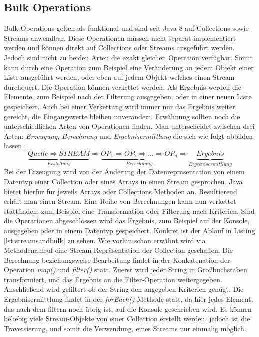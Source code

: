 \subsection{Bulk Operations}
Bulk Operations gelten als funktional und sind seit Java 8 auf Collections sowie Streams anwendbar. Diese Operationen müssen nicht separat implementiert werden und können direkt auf Collections oder Streams ausgeführt werden. Jedoch sind nicht zu beiden Arten die exakt gleichen Operation verfügbar. Somit kann durch eine Operation zum Beispiel eine Veränderung an jedem Objekt einer Liste ausgeführt werden, oder eben auf jedem Objekt welches einen Stream durchquert. Die Operation können verkettet werden. Als Ergebnis werden die Elemente, zum Beispiel nach der Filterung ausgegeben, oder in einer neuen Liste gespeichert. Auch bei einer Verkettung wird immer nur das Ergebnis weiter gereicht, die Eingangswerte bleiben unverändert. Erwähnung sollten noch die unterschiedlichen Arten von Operationen finden. Man unterscheidet zwischen drei Arten: \textit{Erzeugung}, \textit{Berechnung} und \textit{Ergebnisermittlung} die sich wie folgt abbilden lassen \cite{Inden.2015} : 
\begin{displaymath}
\underbrace{Quelle \Rightarrow STREAM}_{Erstellung} \Rightarrow \underbrace{OP_{1} \Rightarrow OP_{2} \Rightarrow ... \Rightarrow OP_{n}}_{Berechnung} \Rightarrow \underbrace{Ergebnis}_{Ergebnisermittlung}
\end{displaymath}
Bei der Erzeugung wird von der Änderung der Datenrepräsentation von einem Datentyp einer Collection oder eines Arrays in einen Stream gesprochen. Java bietet hierfür für jeweils Arrays oder Collections Methoden an. Resultierend erhält man einen Stream. Eine Reihe von Berechnungen kann nun verkettet stattfinden, zum Beispiel eine Transformation oder Filterung nach Kriterien. Sind die Operationen abgeschlossen wird das Ergebnis, zum Beispiel auf der Konsole, ausgegeben oder in einem Datentyp gespeichert. Konkret ist der Ablauf in Listing \ref{lst:streamsandbulk} zu sehen. Wie vorhin schon erwähnt wird via Methodenaufruf eine Stream-Repräsentation der Collection geschaffen. Die Berechnung beziehungsweise Bearbeitung findet in der Konkatenation der Operation \textit{map()} und \textit{filter()} statt. Zuerst wird jeder String in Großbuchstaben transformiert, und das Ergebnis an die Filter-Operation weitergegeben. Anschließend wird gefiltert ob der String den angegeben Kriterien genügt. Die Ergebnisermittlung findet in der \textit{forEach()}-Methode statt, da hier jedes Element, das nach dem filtern noch übrig ist, auf die Konsole geschrieben wird. Es können beliebig viele Stream-Objekte von einer Collection erstellt werden, jedoch ist die Traversierung, und somit die Verwendung, eines Streams nur einmalig möglich.

